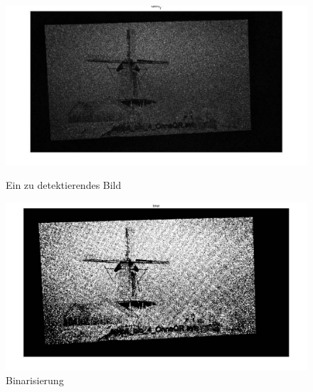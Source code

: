 \begin{figure}[H]
\centering 
\begin{minipage}[b]{0.49\textwidth} 
\centering 
\includegraphics[width=1.0\textwidth]{images/5_Implementirung/2/diff.pdf} 
\caption{Ein zu detektierendes Bild}
\label{fig:diff2}
\end{minipage}
\begin{minipage}[b]{0.49\textwidth} 
\centering 
\includegraphics[width=1.0\textwidth]{images/5_Implementirung/2/bina.pdf}
\caption{Binarisierung}
\label{fig:binar2}
\end{minipage}
\end{figure}

